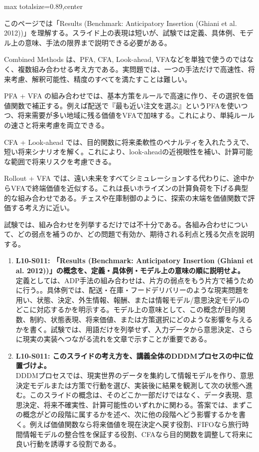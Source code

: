 \begin{minipage}[t]{0.58\textwidth}
\begin{adjustbox}{max totalsize={\textwidth}{0.89\textheight},center}
\begin{minipage}{\textwidth}\scriptsize
{}このページでは「Results (Benchmark: Anticipatory Insertion (Ghiani et al. 2012))」を理解する。スライド上の表現は短いが、試験では定義、具体例、モデル上の意味、手法の限界まで説明できる必要がある。\par
Combined Methods は、PFA, CFA, Look-ahead, VFAなどを単独で使うのではなく、複数組み合わせる考え方である。実問題では、一つの手法だけで高速性、将来考慮、解釈可能性、精度のすべてを満たすことは難しい。\par
PFA + VFA の組み合わせでは、基本方策をルールで高速に作り、その選択を価値関数で補正する。例えば配送で『最も近い注文を選ぶ』というPFAを使いつつ、将来需要が多い地域に残る価値をVFAで加味する。これにより、単純ルールの速さと将来考慮を両立できる。\par
CFA + Look-ahead では、目的関数に将来柔軟性のペナルティを入れたうえで、短い将来シナリオを解く。これにより、look-aheadの近視眼性を補い、計算可能な範囲で将来リスクを考慮できる。\par
Rollout + VFA では、遠い未来をすべてシミュレーションする代わりに、途中からVFAで終端価値を近似する。これは長いホライズンの計算負荷を下げる典型的な組み合わせである。チェスや在庫制御のように、探索の末端を価値関数で評価する考え方に近い。\par
試験では、組み合わせを列挙するだけでは不十分である。各組み合わせについて、どの弱点を補うのか、どの問題で有効か、期待される利点と残る欠点を説明する。\par{}\begin{enumerate}\item \textbf{L10-S011: 「Results (Benchmark: Anticipatory Insertion (Ghiani et al. 2012))」の概念を、定義・具体例・モデル上の意味の順に説明せよ。}\\定義としては、ADP手法の組み合わせは、片方の弱点をもう片方で補うために行う。。具体例では、配送・在庫・フードデリバリーのような現実問題を用い、状態、決定、外生情報、報酬、または情報モデル/意思決定モデルのどこに対応するかを明示する。モデル上の意味として、この概念が目的関数、制約、状態表現、将来価値、または方策選択にどのような影響を与えるかを書く。試験では、用語だけを列挙せず、入力データから意思決定、さらに現実の実装へつながる流れを文章で示すことが重要である。\item \textbf{L10-S011: このスライドの考え方を、講義全体のDDDMプロセスの中に位置づけよ。}\\DDDMプロセスでは、現実世界のデータを集約して情報モデルを作り、意思決定モデルまたは方策で行動を選び、実装後に結果を観測して次の状態へ進む。このスライドの概念は、そのどこか一部だけではなく、データ表現、意思決定、将来不確実性、計算可能性のいずれかに関わる。答案では、まずこの概念がどの段階に属するかを述べ、次に他の段階へどう影響するかを書く。例えば価値関数なら将来価値を現在決定へ戻す役割、FIFOなら旅行時間情報モデルの整合性を保証する役割、CFAなら目的関数を調整して将来に良い行動を誘導する役割である。\end{enumerate}

\end{minipage}
\end{adjustbox}
\end{minipage}

